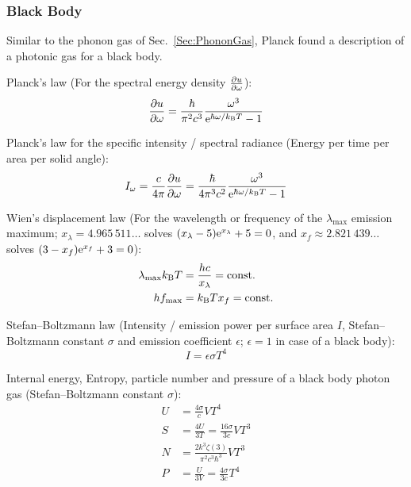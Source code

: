 		\subsubsection{Black Body}
			\noindent
			Similar to the phonon gas of Sec.~\ref{Sec:PhononGas}, Planck found a description of a photonic gas for a black body. \vsp

			\noindent
			Planck's law (For the spectral energy density $\pdv{u}{\omega}$):
			\begin{equation}
				\begin{aligned}
					\pdv{u}{\omega}(\omega,T) &= \frac{\hbar}{\pi^2 c^3} \frac{\omega^3}{\mathrm{e}^{\hbar \omega / k_{\text{B}} T} - 1} \\
				\end{aligned}
			\end{equation}

			\noindent
			Planck's law for the specific intensity / spectral radiance (Energy per time per area per solid angle):
			\begin{equation}
				I_\omega = \frac{c}{4\pi} \pdv{u}{\omega}
				= \frac{\hbar}{4 \pi^3 c^2} \frac{\omega^3}{\mathrm{e}^{\hbar \omega / k_{\text{B}} T} - 1}
			\end{equation}

			\noindent
			Wien's displacement law (For the wavelength or frequency of the $\lambda_{\max}$ emission maximum; $x_\lambda=4.965\,511\dots$ solves $(x_\lambda-5)\mathrm{e}^{x_\lambda}+5=0$, and $x_f\approx2.821\,439\dots$ solves $(3-x_f)\mathrm{e}^{x_f}+3=0$):
			\begin{equation}
				\begin{aligned}
					\lambda_{\max} k_{\text{B}} T &= \frac{h c}{x_\lambda} = \mathrm{const.} \\
					h f_{\max} &= k_{\text{B}} T x_f = \mathrm{const.} \\
				\end{aligned}
			\end{equation}

			\noindent
			Stefan--Boltzmann law (Intensity / emission power per surface area $I$, Stefan--Boltzmann constant $\sigma$ and emission coefficient $\epsilon$; $\epsilon=1$ in case of a black body):
			\begin{equation}
				I = \epsilon\sigma T^4
			\end{equation}

			\noindent
			Internal energy, Entropy, particle number and pressure of a black body photon gas (Stefan--Boltzmann constant $\sigma$):
			\begin{align}
				U &= \frac{4\sigma}{c} V T^4 \\
				S &= \frac{4 U}{3 T} = \frac{16 \sigma}{3 c} V T^3 \\
				N &= \frac{2 k^3 \zeta(3)}{\pi^2 c^3 \hbar^3} V T^3 \\
				P &= \frac{U}{3V} = \frac{4\sigma}{3c} T^4
			\end{align}

